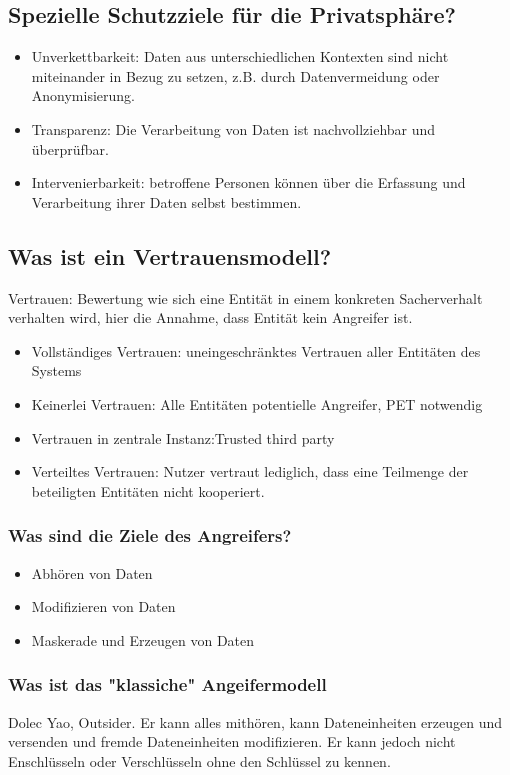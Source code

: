 	\subsection{Spezielle Schutzziele für die Privatsphäre?}
	\begin{itemize}
		\item Unverkettbarkeit: Daten aus unterschiedlichen Kontexten sind nicht miteinander in Bezug zu setzen, z.B. durch Datenvermeidung oder Anonymisierung.
		\item Transparenz: Die Verarbeitung von Daten ist nachvollziehbar und überprüfbar. 
		\item Intervenierbarkeit: betroffene Personen können über die Erfassung und Verarbeitung ihrer Daten selbst bestimmen.
		
\end{itemize}		
	
	\subsection{Was ist ein Vertrauensmodell?}
	Vertrauen: Bewertung wie sich eine Entität in einem konkreten Sacherverhalt verhalten wird, hier die Annahme, dass Entität kein Angreifer ist.
	\begin{itemize}
		\item Vollständiges Vertrauen: uneingeschränktes Vertrauen aller Entitäten des Systems
		\item Keinerlei Vertrauen: Alle Entitäten potentielle Angreifer, PET notwendig
		\item Vertrauen in zentrale Instanz:Trusted third party
		\item Verteiltes Vertrauen: Nutzer vertraut lediglich, dass eine Teilmenge der beteiligten Entitäten nicht kooperiert.
		
	\end{itemize}
	\subsubsection{Was sind die Ziele des Angreifers?}
	\begin{itemize}
		\item Abhören von Daten
		\item Modifizieren von Daten
		\item Maskerade und Erzeugen von Daten
	\end{itemize}
	\subsubsection{Was ist das "klassiche" Angeifermodell}
	Dolec\- Yao, Outsider. Er kann alles mithören, kann Dateneinheiten erzeugen und versenden und fremde Dateneinheiten modifizieren. Er kann jedoch nicht Enschlüsseln oder Verschlüsseln ohne den Schlüssel zu kennen.
	
